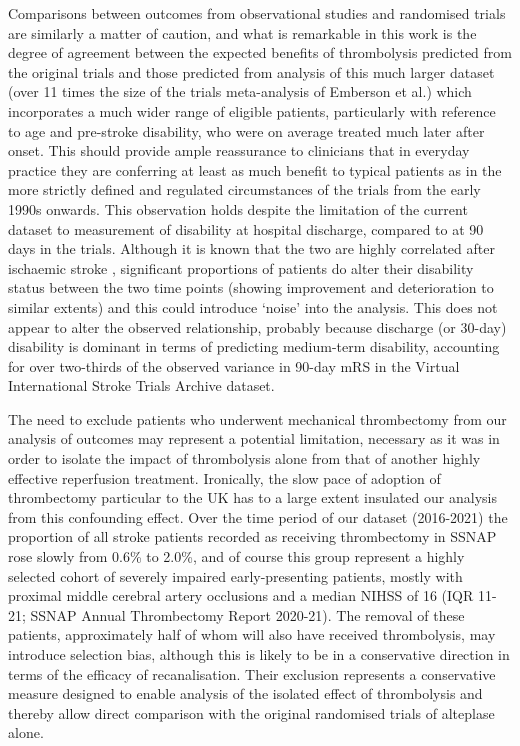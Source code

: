 Comparisons between outcomes from observational studies and randomised trials are similarly a matter of caution, and what is remarkable in this work is the degree of agreement between the expected benefits of thrombolysis predicted from the original trials and those predicted from analysis of this much larger dataset (over 11 times the size of the trials meta-analysis of Emberson et al.\cite{emberson_effect_2014}) which incorporates a much wider range of eligible patients, particularly with reference to age and pre-stroke disability, who were on average treated much later after onset. This should provide ample reassurance to clinicians that in everyday practice they are conferring at least as much benefit to typical patients as in the more strictly defined and regulated circumstances of the trials from the early 1990s onwards. This observation holds despite the limitation of the current dataset to measurement of disability at hospital discharge, compared to at 90 days in the trials. Although it is known that the two are highly correlated after ischaemic stroke \cite{elhabr_predicting_2021, ovbiagele_disability_2010}, significant proportions of patients do alter their disability status between the two time points (showing improvement and deterioration to similar extents\cite{elhabr_predicting_2021}) and this could introduce ‘noise’ into the analysis. This does not appear to alter the observed relationship, probably because discharge (or 30-day) disability is dominant in terms of predicting medium-term disability, accounting for over two-thirds of the observed variance in 90-day mRS in the Virtual International Stroke Trials Archive dataset\cite{ovbiagele_disability_2010}.

The need to exclude patients who underwent mechanical thrombectomy from our analysis of outcomes may represent a potential limitation, necessary as it was in order to isolate the impact of thrombolysis alone from that of another highly effective reperfusion treatment. Ironically, the slow pace of adoption of thrombectomy particular to the UK has to a large extent insulated our analysis from this confounding effect. Over the time period of our dataset (2016-2021) the proportion of all stroke patients recorded as receiving thrombectomy in SSNAP rose slowly from 0.6\% to 2.0\%, and of course this group represent a highly selected cohort of severely impaired early-presenting patients, mostly with proximal middle cerebral artery occlusions and a median NIHSS of 16 (IQR 11-21; SSNAP Annual Thrombectomy Report 2020-21\cite{sentinel_stroke_national_audit_programme_sentinel_2021}). The removal of these patients, approximately half of whom will also have received thrombolysis, may introduce selection bias, although this is likely to be in a conservative direction in terms of the efficacy of recanalisation. Their exclusion represents a conservative measure designed to enable analysis of the isolated effect of thrombolysis and thereby allow direct comparison with the original randomised trials of alteplase alone.